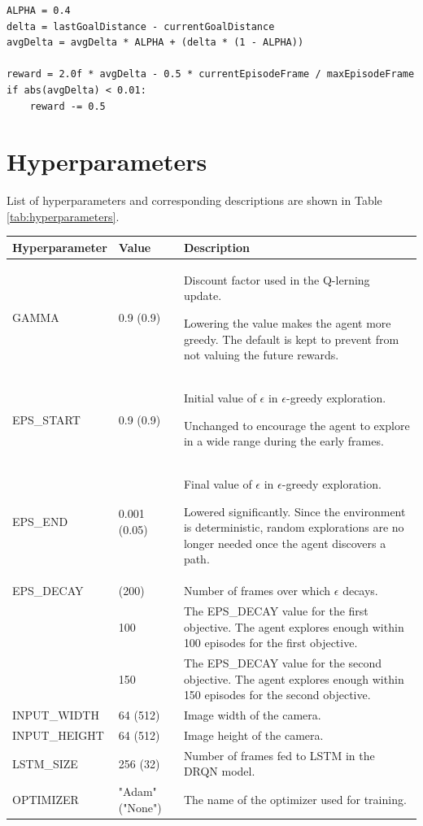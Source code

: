 \documentclass[a4paper]{article}
\begin{document}
\begin{verbatim}
ALPHA = 0.4
delta = lastGoalDistance - currentGoalDistance
avgDelta = avgDelta * ALPHA + (delta * (1 - ALPHA))

reward = 2.0f * avgDelta - 0.5 * currentEpisodeFrame / maxEpisodeFrame
if abs(avgDelta) < 0.01:
	reward -= 0.5
\end{verbatim}

\section{Hyperparameters}
List of hyperparameters and corresponding descriptions are shown in Table \ref{tab:hyperparameters}.

\begin{table}[htp]
\centering
\begin{tabular}{p{3.5cm}|p{1.5cm}|p{8.5cm}}
Hyperparameter & Value & Description \\
\hline
GAMMA & 0.9 (0.9) & Discount factor used in the Q-lerning \cite{Watkins92q-learning} update.

Lowering the value makes the agent more greedy. The default is kept to prevent from not valuing the future rewards. \\
EPS\_START & 0.9 (0.9) & Initial value of \(\epsilon\) in \(\epsilon\)-greedy exploration.

Unchanged to encourage the agent to explore in a wide range during the early frames. \\
EPS\_END & 0.001 (0.05) & Final value of \(\epsilon\) in \(\epsilon\)-greedy exploration.

Lowered significantly. Since the environment is deterministic, random explorations are no longer needed once the agent discovers a path. \\
EPS\_DECAY & (200) & Number of frames over which  \(\epsilon\) decays. \\
 & 100 & The EPS\_DECAY value for the first objective. The agent explores enough within 100 episodes for the first objective. \\
 & 150 & The EPS\_DECAY value for the second objective.  The agent explores enough within 150 episodes for the second objective. \\
INPUT\_WIDTH & 64 (512) & Image width of the camera. \\
INPUT\_HEIGHT & 64 (512) & Image height of the camera. \\
LSTM\_SIZE & 256 (32) & Number of frames fed to LSTM \cite{Hochreiter:1997:LSM:1246443.1246450} in the DRQN model. \\
OPTIMIZER & "Adam" ("None") & The name of the optimizer used for training.


\end{tabular}
\end{table}
\end{document}
